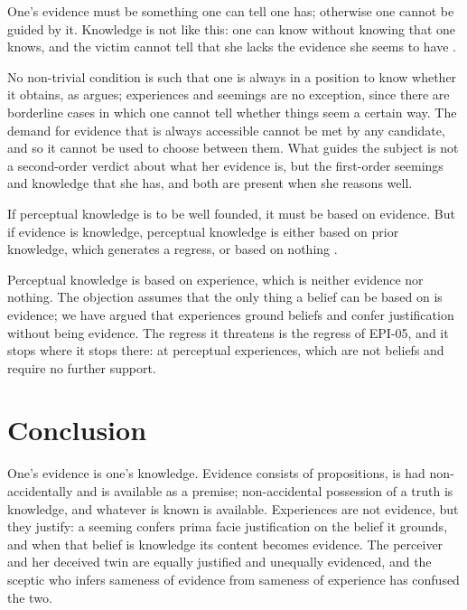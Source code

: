 \documentclass{situationist-preprint}
\begin{document}
\begin{objection}[Access]
One's evidence must be something one can tell one has; otherwise one cannot be guided by it. Knowledge is not like this: one can know without knowing that one knows, and the victim cannot tell that she lacks the evidence she seems to have \citep{ConeeFeldman2004}.
\end{objection}

\begin{reply}
No non-trivial condition is such that one is always in a position to know whether it obtains, as \citet[ch.~4]{Williamson2000} argues; experiences and seemings are no exception, since there are borderline cases in which one cannot tell whether things seem a certain way. The demand for evidence that is always accessible cannot be met by any candidate, and so it cannot be used to choose between them. What guides the subject is not a second-order verdict about what her evidence is, but the first-order seemings and knowledge that she has, and both are present when she reasons well.
\end{reply}

\begin{objection}
If perceptual knowledge is to be well founded, it must be based on evidence. But if evidence is knowledge, perceptual knowledge is either based on prior knowledge, which generates a regress, or based on nothing \citep{Brueckner2005}.
\end{objection}

\begin{reply}
Perceptual knowledge is based on experience, which is neither evidence nor nothing. The objection assumes that the only thing a belief can be based on is evidence; we have argued that experiences ground beliefs and confer justification without being evidence. The regress it threatens is the regress of EPI-05, and it stops where it stops there: at perceptual experiences, which are not beliefs and require no further support.
\end{reply}

\section{Conclusion}

One's evidence is one's knowledge. Evidence consists of propositions, is had non-accidentally and is available as a premise; non-accidental possession of a truth is knowledge, and whatever is known is available. Experiences are not evidence, but they justify: a seeming confers prima facie justification on the belief it grounds, and when that belief is knowledge its content becomes evidence. The perceiver and her deceived twin are equally justified and unequally evidenced, and the sceptic who infers sameness of evidence from sameness of experience has confused the two.
\end{document}
